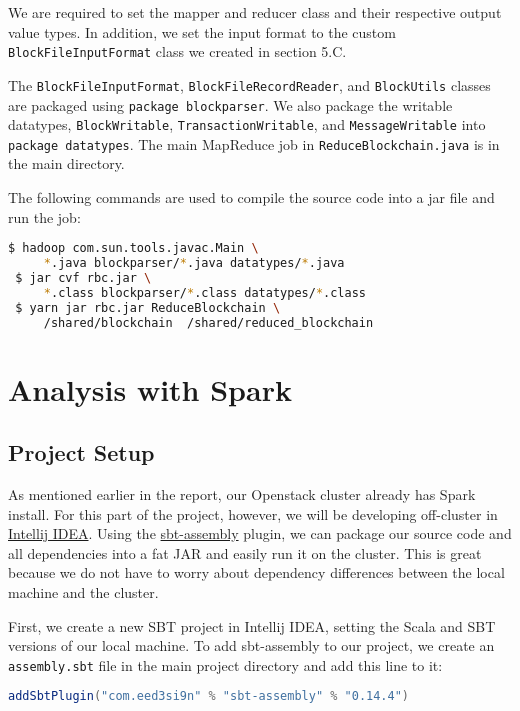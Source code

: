 \documentclass[9pt,twocolumn,twoside]{idsi}
\begin{document}
We are required to set the mapper and reducer class and their respective output value types. In addition, we set the input format to the custom \lstinline{BlockFileInputFormat} class we created in section 5.C.

The \lstinline{BlockFileInputFormat}, \lstinline{BlockFileRecordReader}, and \lstinline{BlockUtils} classes are packaged using \lstinline{package blockparser}. We also package the writable datatypes, \lstinline{BlockWritable}, \lstinline{TransactionWritable}, and \lstinline{MessageWritable} into \lstinline{package datatypes}. The main MapReduce job in \lstinline{ReduceBlockchain.java} is in the main directory.

The following commands are used to compile the source code into a jar file and run the job:

\begin{lstlisting}[language=bash]
 $ hadoop com.sun.tools.javac.Main \
     *.java blockparser/*.java datatypes/*.java
 $ jar cvf rbc.jar \
     *.class blockparser/*.class datatypes/*.class
 $ yarn jar rbc.jar ReduceBlockchain \
     /shared/blockchain  /shared/reduced_blockchain
\end{lstlisting}

\section{Analysis with Spark}
\subsection{Project Setup}
As mentioned earlier in the report, our Openstack cluster already has Spark install. For this part of the project, however, we will be developing off-cluster in \href{https://www.jetbrains.com/idea/}{Intellij IDEA}. Using the \href{https://github.com/sbt/sbt-assembly}{sbt-assembly} plugin, we can package our source code and all dependencies into a fat JAR and easily run it on the cluster. This is great because we do not have to worry about dependency differences between the local machine and the cluster.

First, we create a new SBT project in Intellij IDEA, setting the Scala and SBT versions of our local machine. To add sbt-assembly to our project, we create an \lstinline{assembly.sbt} file in the main project directory and add this line to it:

\begin{lstlisting}[language=Scala]
addSbtPlugin("com.eed3si9n" % "sbt-assembly" % "0.14.4")
\end{lstlisting}
\end{document}
